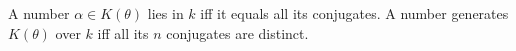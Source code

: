 A number $\alpha \in K(\theta)$ lies in $k$ iff it equals all its conjugates. A number generates $K(\theta)$ over $k$ iff all its $n$ conjugates are distinct.
